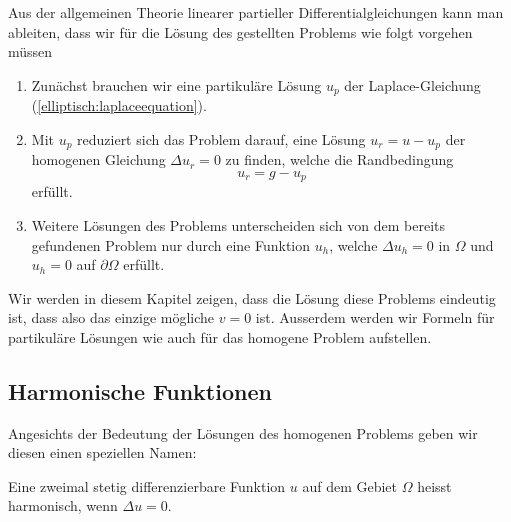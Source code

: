 Aus der allgemeinen Theorie linearer partieller Differentialgleichungen
kann man ableiten, dass wir für
die Lösung des gestellten Problems wie folgt vorgehen müssen
\begin{enumerate}
\item Zunächst brauchen wir eine partikuläre
Lösung $u_p$ der Laplace-Gleichung (\ref{elliptisch:laplaceequation}).
\item Mit $u_p$ reduziert sich das Problem darauf, eine Lösung
$u_r=u-u_p$ der homogenen Gleichung $\Delta u_r=0$
zu finden, welche die Randbedingung
\[
u_r=g-u_p
\]
erfüllt.
\item
Weitere Lösungen des Problems unterscheiden sich von dem
bereits gefundenen Problem nur durch eine Funktion $u_h$, welche
$\Delta u_h=0$ in $\Omega$ und $u_h=0$ auf $\partial\Omega$ erfüllt.
\end{enumerate}
Wir werden in diesem Kapitel zeigen, dass die Lösung diese Problems
eindeutig ist, dass also das einzige mögliche $v=0$ ist.
Ausserdem werden wir Formeln für partikuläre Lösungen wie auch für
das homogene Problem aufstellen.

\subsection{Harmonische Funktionen}
Angesichts der Bedeutung der Lösungen des homogenen Problems
geben wir diesen einen speziellen Namen:

\begin{definition}
Eine zweimal stetig differenzierbare Funktion $u$ auf dem Gebiet $\Omega$
heisst harmonisch, wenn $\Delta u=0$.
\end{definition}

